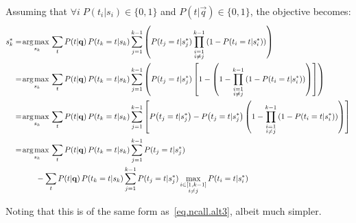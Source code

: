 \noindent
Assuming that $\forall i \; P(t_i|s_i) \in \{0,1\}$ and $P(t|\vec{q}) \in \{0,1\}$, the objective becomes:
\begin{align}
  s_k^* & = \argmax_{s_k} \sum_t P(t|\vec{q}) \, P(t_k = t | s_k) \sum_{j=1}^{k-1} \left( P(t_j=t|s_j^*) \prod_{\substack{i=1 \\ i \neq j}}^{k-1} \left( 1 - P \! \left( t_i=t|s_i^* \right) \right) \right) \nonumber \\
  & = \argmax_{s_k} \sum_t P(t|\vec{q}) \, P(t_k = t | s_k) \sum_{j=1}^{k-1} \left( P(t_j=t|s_j^*) \left[ 1 - \left( 1 - \prod_{\substack{i=1 \\ i \neq j}}^{k-1} \left( 1 - P \! \left( t_i=t|s_i^* \right) \right) \right) \right] \right) \nonumber \\
  & = \argmax_{s_k} \sum_t P(t|\vec{q}) \, P(t_k = t | s_k) \sum_{j=1}^{k-1} \left[ P \! \left( t_j=t|s_j^* \right) - P \! \left( t_j=t|s_j^* \right) \left( 1 - \prod_{\substack{i=1 \\ i \neq j}}^{k-1} \left( 1 - P \! \left( t_i=t|s_i^* \right) \right) \right) \right] \nonumber \\
  & = \argmax_{s_k} \sum_t P(t|\vec{q}) \, P(t_k = t | s_k) \sum_{j=1}^{k-1} P(t_j=t|s_j^*) \nonumber \\
  & \hspace{10mm} - \sum_t P(t|\vec{q}) \, P(t_k = t | s_k) \sum_{j=1}^{k-1} P(t_j=t|s_j^*) \max_{\substack{ i \in [1, k-1] \\ i \neq j}} P(t_i=t|s_i^*) \nonumber
\end{align}

\noindent
Noting that this is of the same form as~\eqref{eq.ncall.alt3}, albeit much simpler.